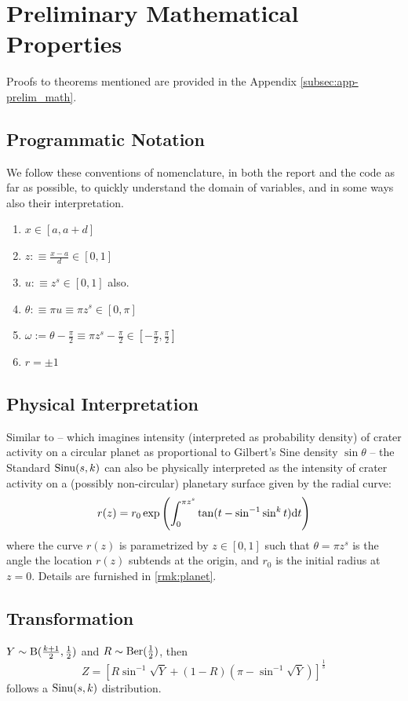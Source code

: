 \section{Preliminary Mathematical Properties}
Proofs to theorems mentioned are provided in the Appendix \autoref{subsec:app-prelim_math}.

	\subsection*{Programmatic Notation}
	We follow these conventions of nomenclature, in both the report and the code as far as possible, to quickly understand the domain of variables, and in some ways also their interpretation.
	\begin{enumerate}
		\item $x \in [a, a+d]$
		\item $z :\equiv\frac{x-a}{d} \in [0,1]$
		\item $u :\equiv z^s\in [0,1]$ also.
		\item $\theta :\equiv \pi u \equiv \pi z^s \in [0,\pi]$
		\item $\omega := \theta - \frac{\pi}{2} \equiv \pi z^s - \frac{\pi}{2} \in [-\frac{\pi}{2}, \frac{\pi}{2}]$
		\item $r = \pm 1$
	\end{enumerate}


\subsection{Physical Interpretation}
Similar to \cite{gilbert1893moon} -- which imagines intensity (interpreted as probability density) of crater activity on a circular planet as proportional to Gilbert's Sine density $\sin\theta$ -- the Standard \sindist{} $\operatorname*{Sinu}(s,k)$ can also be physically interpreted as the intensity of crater activity on a (possibly non-circular) planetary surface given by the radial curve:
\begin{equation}
	r(z) = r_0 \exp\left(\int_0^{\pi z^s} \tan(t - \sin^{-1}\sin^k t) \mathrm d t\right)
\end{equation}
where the curve $r(z)$ is parametrized by $z \in [0,1]$ such that $\theta=\pi z^s$ is the angle the location $r(z)$ subtends at the origin, and $r_0$ is the initial radius at $z=0$. Details are furnished in \autoref{rmk:planet}.


	\subsection{Transformation}
	\begin{thm} \label{thm:transform}
		$Y \sim \mathrm B(\frac{k+1}{2}, \frac{1}{2})$ and $R \sim \mathrm{Ber} (\frac 1 2)$, then
		\[Z = \left[ R \sin^{-1} \sqrt Y + (1-R) (\pi - \sin^{-1} \sqrt Y) \right]^\frac{1}{s}\]
		follows a $\operatorname*{Sinu}(s,k)$ distribution.
	\end{thm}



